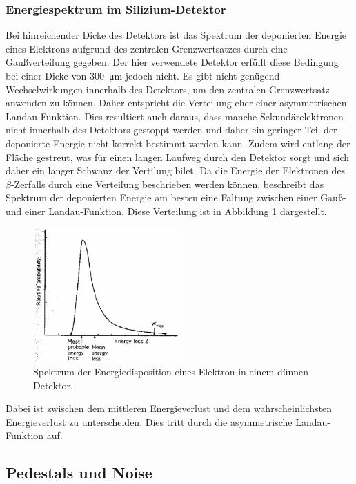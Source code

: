 \subsubsection{Energiespektrum im Silizium-Detektor}
Bei hinreichender Dicke des Detektors ist das Spektrum der deponierten Energie eines
Elektrons aufgrund des zentralen Grenzwertsatzes durch eine Gaußverteilung gegeben.
Der hier verwendete Detektor erfüllt diese Bedingung bei einer Dicke von
\SI{300}{\micro\meter} jedoch nicht. Es gibt nicht genügend Wechselwirkungen
innerhalb des Detektors, um den zentralen Grenzwertsatz anwenden zu können.
Daher entspricht die Verteilung eher einer asymmetrischen Landau-Funktion.
Dies resultiert auch daraus, dass manche
Sekundärelektronen nicht innerhalb des Detektors gestoppt werden und daher
ein geringer Teil der deponierte Energie nicht korrekt bestimmt werden kann. Zudem
wird entlang der Fläche gestreut, was für einen langen Laufweg durch den Detektor
sorgt und sich daher ein langer Schwanz der Vertilung bilet.
Da die Energie der Elektronen des $\beta$-Zerfalls durch eine Verteilung beschrieben
werden können, beschreibt das Spektrum der deponierten Energie am besten eine Faltung zwischen
einer Gauß- und einer Landau-Funktion. Diese Verteilung ist in Abbildung \ref{fig:faltung}
dargestellt.
\begin{figure}[htb]
  \centering
  \includegraphics[width=0.5\textwidth]{graphics/Landau.pdf}
  \caption{Spektrum der Energiedisposition eines Elektron in einem dünnen Detektor. \cite{anleitung}}
  \label{fig:faltung}
\end{figure}
Dabei ist zwischen dem mittleren Energieverlust und dem wahrscheinlichsten Energieverlust
zu unterscheiden. Dies tritt durch die asymmetrische Landau-Funktion auf.


\FloatBarrier
\subsection{Pedestals und Noise}
\label{sec:Theorie_Noise}

